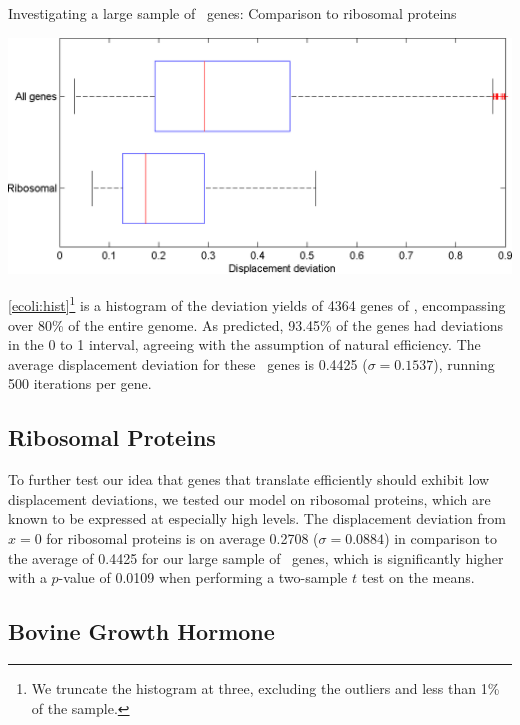 \documentclass[twocolumn]{article}
\begin{document}
\begin{cfigure}
  \caption{Investigating a large sample of \ecoli\ genes: Comparison
    to ribosomal proteins}
  \label{ribosomal:comp}
  \includegraphics[width=\linewidth]{histograms/ribosomal}
\end{cfigure}

\autoref{ecoli:hist}\footnote{We truncate the histogram at three, excluding
  the outliers and less than 1\% of the sample.} is a histogram of the
deviation yields of 4364 genes of \ecoli, encompassing over 80\% of the entire
genome.  As predicted, 93.45\% of the genes had deviations in the 0
to 1 interval, agreeing with the assumption of natural efficiency.  The
average displacement deviation for these \ecoli\ genes is 0.4425 ($\sigma = 0.1537$), 
running 500 iterations per gene.

\subsection{Ribosomal Proteins}
\label{section:riboproteins}
To further test our idea that genes that translate efficiently should exhibit
low displacement deviations, we tested our model on ribosomal proteins, which
are known to be expressed at especially high levels.
The displacement deviation from $x=0$ for ribosomal proteins
is on average 0.2708 ($\sigma = 0.0884$) in comparison to the average of 0.4425 for our
large sample of \ecoli\ genes, which is significantly higher with a $p$-value of
0.0109 when performing a two-sample $t$ test on the means.

\subsection{Bovine Growth Hormone}
\label{section:bgh}
\end{document}

